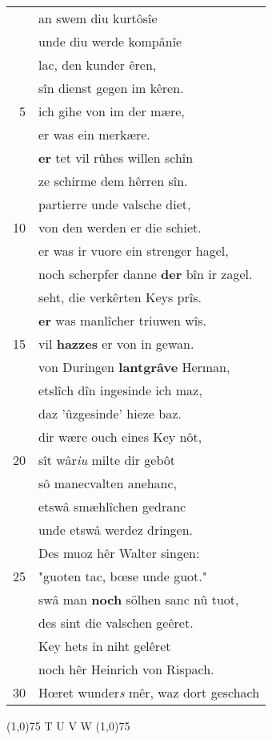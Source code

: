 \documentclass[8pt,a4paper,notitlepage]{article}
\begin{document}
\begin{table}[ht]
\begin{minipage}[t]{0.5\linewidth}
\begin{tabular}{rl}
 & an swem diu kurtôsîe\\ 
 & unde diu werde kompânîe\\ 
 & lac, den kunder êren,\\ 
 & sîn dienst gegen im kêren.\\ 
5 & ich gihe von im der mære,\\ 
 & er was ein merkære.\\ 
 & \textbf{er} tet vil rûhes willen schîn\\ 
 & ze schirme dem hêrren sîn.\\ 
 & partierre unde valsche diet,\\ 
10 & von den werden er die schiet.\\ 
 & er was ir vuore ein strenger hagel,\\ 
 & noch scherpfer danne \textbf{der} bîn ir zagel.\\ 
 & seht, die verkêrten Keys prîs.\\ 
 & \textbf{er} was manlîcher triuwen wîs.\\ 
15 & vil \textbf{hazzes} er von in gewan.\\ 
 & von Duringen \textbf{lantgrâve} Herman,\\ 
 & etslîch dîn ingesinde ich maz,\\ 
 & daz 'ûzgesinde' hieze baz.\\ 
 & dir wære ouch eines Key nôt,\\ 
20 & sît wâr\textit{iu} milte dir gebôt\\ 
 & sô manecvalten anehanc,\\ 
 & etswâ smæhlîchen gedranc\\ 
 & unde etswâ werdez dringen.\\ 
 & Des muoz hêr Walter singen:\\ 
25 & "guoten tac, bœse unde guot."\\ 
 & swâ man \textbf{noch} sölhen sanc nû tuot,\\ 
 & des sint die valschen geêret.\\ 
 & Key hets in niht gelêret\\ 
 & noch hêr Heinrich von Rispach.\\ 
30 & Hœret wunder\textit{s} mêr, waz dort geschach\\ 
\end{tabular}
\scriptsize
\line(1,0){75} \newline
T U V W \newline
\line(1,0){75} \newline

\end{minipage}
\end{table}
\end{document}
